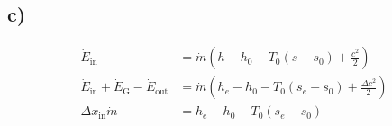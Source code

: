 

\subsection*{c)}
\begin{align*}
    \dot{E}_{\text{in}} &= \dot{m} \left( h - h_0 - T_0 (s - s_0) + \frac{c^2}{2} \right) \\
    \dot{E}_{\text{in}} + \dot{E}_{\text{G}} - \dot{E}_{\text{out}} &= \dot{m} \left( h_e - h_0 - T_0 (s_e - s_0) + \frac{\Delta c^2}{2} \right) \\
    \Delta x_{\text{in}} \dot{m} &= h_e - h_0 - T_0 (s_e - s_0)
\end{align*}